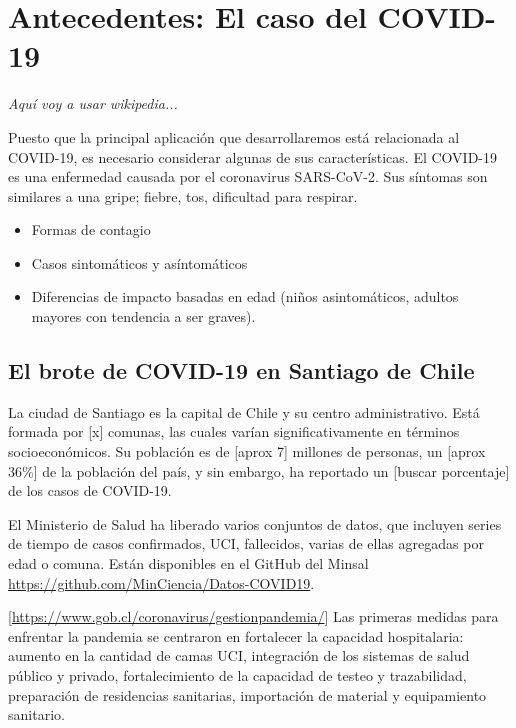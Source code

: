 \section{Antecedentes: El caso del COVID-19} \label{sec:antecedentes}

\textit{Aquí voy a usar wikipedia...}

Puesto que la principal aplicación que desarrollaremos está relacionada al COVID-19, es necesario considerar algunas de sus características. El COVID-19 es una enfermedad causada por el coronavirus SARS-CoV-2. Sus síntomas son similares a una gripe; fiebre, tos, dificultad para respirar.
\begin{itemize}
\item Formas de contagio 
\item Casos sintomáticos y asíntomáticos 
\item Diferencias de impacto basadas en edad (niños asintomáticos, adultos mayores con tendencia a ser graves).

\end{itemize}


\subsection{El brote de COVID-19 en Santiago de Chile }

La ciudad de Santiago es la capital de Chile y su centro administrativo. Está formada por [x] comunas, las cuales varían significativamente en términos socioeconómicos. Su población es de [aprox 7] millones de personas, un [aprox 36\%] de la población del país, y sin embargo, ha reportado un [buscar porcentaje] de los casos de COVID-19.

El Ministerio de Salud ha liberado varios conjuntos de datos, que incluyen series de tiempo de casos confirmados, UCI, fallecidos, varias de ellas agregadas por edad o comuna. Están disponibles en el GitHub del Minsal \url{https://github.com/MinCiencia/Datos-COVID19}.



[\url{https://www.gob.cl/coronavirus/gestionpandemia/}]
Las primeras medidas para enfrentar la pandemia se centraron en fortalecer la capacidad hospitalaria: aumento en la cantidad de camas UCI, integración de los sistemas de salud público y privado, fortalecimiento de la capacidad de testeo y trazabilidad, preparación de residencias sanitarias, importación de material y equipamiento sanitario.

